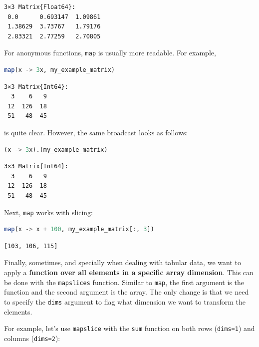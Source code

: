 \documentclass[
  notoc %
]{tufte-book}
\newcommand{\passthrough}[1]{#1}
\begin{document}
\begin{lstlisting}[language=Output]
3×3 Matrix{Float64}:
 0.0      0.693147  1.09861
 1.38629  3.73767   1.79176
 2.83321  2.77259   2.70805
\end{lstlisting}

For anonymous functions, \passthrough{\lstinline!map!} is usually more
readable. For example,

\begin{lstlisting}[language=Julia]
map(x -> 3x, my_example_matrix)
\end{lstlisting}

\begin{lstlisting}[language=Output]
3×3 Matrix{Int64}:
  3    6   9
 12  126  18
 51   48  45
\end{lstlisting}

is quite clear. However, the same broadcast looks as follows:

\begin{lstlisting}[language=Julia]
(x -> 3x).(my_example_matrix)
\end{lstlisting}

\begin{lstlisting}[language=Output]
3×3 Matrix{Int64}:
  3    6   9
 12  126  18
 51   48  45
\end{lstlisting}

Next, \passthrough{\lstinline!map!} works with slicing:

\begin{lstlisting}[language=Julia]
map(x -> x + 100, my_example_matrix[:, 3])
\end{lstlisting}

\begin{lstlisting}[language=Output]
[103, 106, 115]
\end{lstlisting}

Finally, sometimes, and specially when dealing with tabular data, we
want to apply a \textbf{function over all elements in a specific array
dimension}. This can be done with the
\passthrough{\lstinline!mapslices!} function. Similar to
\passthrough{\lstinline!map!}, the first argument is the function and
the second argument is the array. The only change is that we need to
specify the \passthrough{\lstinline!dims!} argument to flag what
dimension we want to transform the elements.

For example, let's use \passthrough{\lstinline!mapslice!} with the
\passthrough{\lstinline!sum!} function on both rows
(\passthrough{\lstinline!dims=1!}) and columns
(\passthrough{\lstinline!dims=2!}):
\end{document}
